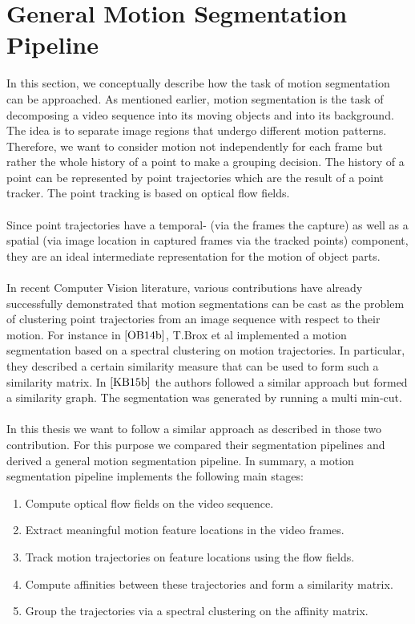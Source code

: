\section{General Motion Segmentation Pipeline}
In this section, we conceptually describe how the task of motion segmentation can be approached. As mentioned earlier, motion segmentation is the task of decomposing a video sequence into its moving objects and into its background. The idea is to separate image regions that undergo different motion patterns. Therefore, we want to consider motion not independently for each frame but rather the whole history of a point to make a grouping decision. The history of a point can be represented by point trajectories which are the result of a point tracker. The point tracking is based on optical flow fields. \\ \\
Since point trajectories have a temporal- (via the frames the capture) as well as a spatial (via image location in captured frames via the tracked points) component, they are an ideal intermediate representation for the motion of object parts. \\ \\
In recent Computer Vision literature, various contributions have already successfully demonstrated that motion segmentations can be cast as the problem of clustering point trajectories from an image sequence with respect to their motion. For instance in $\cite{OB14b}$, T.Brox et al implemented a motion segmentation based on a spectral clustering on motion trajectories. In particular, they described a certain similarity measure that can be used to form such a similarity matrix. In $\cite{KB15b}$ the authors followed a similar approach but formed a similarity graph. The segmentation was generated by running a multi min-cut. \\ \\
In this thesis we want to follow a similar approach as described in those two contribution. For this purpose we compared their segmentation pipelines and derived a general motion segmentation pipeline. In summary, a motion segmentation pipeline implements the following main stages:
\begin{enumerate}
	\item Compute optical flow fields on the video sequence.
	\item Extract meaningful motion feature locations in the video frames.
	\item Track motion trajectories on feature locations using the flow fields.
	\item Compute affinities between these trajectories and form a similarity matrix.
	\item Group the trajectories via a spectral clustering on the affinity matrix.
\end{enumerate}
